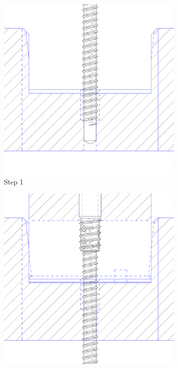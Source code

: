 \begin{figure}[!h]
    \centering
    \begin{subfigure}[b]{0.49\textwidth}
        \centering
        \includegraphics[width=\textwidth]{images/7a/img26.png}
        \caption*{Step 1}
    \end{subfigure}
    \hfill
    \begin{subfigure}[b]{0.49\textwidth}
        \centering
        \includegraphics[width=\textwidth]{images/7a/img27.png}

\end{subfigure}
\end{figure}
